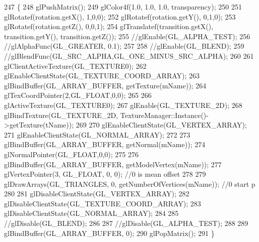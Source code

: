 \begin{DoxyCode}
247 \{
248     glPushMatrix();
249     glColor4f(1.0, 1.0, 1.0, transparency);
250     
251     glRotatef(rotation.getX(), 1,0,0);
252     glRotatef(rotation.getY(), 0,1,0);
253     glRotatef(rotation.getZ(), 0,0,1);
254     glTranslatef(transition.getX(), transition.getY(), transition.getZ());
255     \textcolor{comment}{//glEnable(GL\_ALPHA\_TEST);}
256     \textcolor{comment}{//glAlphaFunc(GL\_GREATER, 0.1);}
257 
258     \textcolor{comment}{//glEnable(GL\_BLEND);}
259     \textcolor{comment}{//glBlendFunc(GL\_SRC\_ALPHA,GL\_ONE\_MINUS\_SRC\_ALPHA);}
260 
261     glClientActiveTexture(GL_TEXTURE0);
262     glEnableClientState(GL\_TEXTURE\_COORD\_ARRAY);
263     glBindBuffer(GL_ARRAY_BUFFER, getTexture(mName));
264     glTexCoordPointer(2,GL\_FLOAT,0,0);
265 
266     glActiveTexture(GL_TEXTURE0);
267     glEnable(GL\_TEXTURE\_2D);
268     glBindTexture(GL\_TEXTURE\_2D, TextureManager::Instance()->getTexture(tName));
269 
270     glEnableClientState(GL\_VERTEX\_ARRAY);
271     glEnableClientState(GL\_NORMAL\_ARRAY);
272 
273     glBindBuffer(GL_ARRAY_BUFFER, getNormal(mName));
274     glNormalPointer(GL\_FLOAT,0,0);
275 
276     glBindBuffer(GL_ARRAY_BUFFER, getModelVertex(mName));
277     glVertexPointer(3, GL\_FLOAT, 0, 0); \textcolor{comment}{//0 is mean offset}
278     
279     glDrawArrays(GL\_TRIANGLES, 0, getNumberOfVertices(mName)); \textcolor{comment}{//0 start p}
280 
281     glDisableClientState(GL\_VERTEX\_ARRAY);
282     glDisableClientState(GL\_TEXTURE\_COORD\_ARRAY);
283     glDisableClientState(GL\_NORMAL\_ARRAY);
284 
285     \textcolor{comment}{//glDisable(GL\_BLEND);}
286 
287     \textcolor{comment}{//glDisable(GL\_ALPHA\_TEST);}
288      
289     glBindBuffer(GL_ARRAY_BUFFER, 0);
290     glPopMatrix();
291 \}
\end{DoxyCode}


